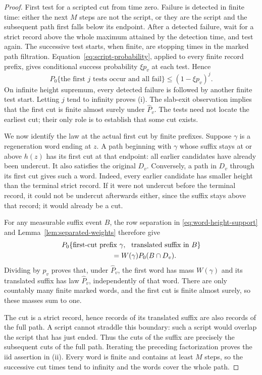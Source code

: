 \begin{proof}
First test for a scripted cut from time zero.  Failure is detected in
finite time: either the next \(M\) steps are not the script, or they
are the script and the subsequent path first falls below its endpoint.
After a detected failure, wait for a strict record above the whole
maximum attained by the detection time, and test again.  The successive
test starts, when finite, are stopping times in the marked path
filtration.  Equation~\eqref{eq:script-probability}, applied to every
finite record prefix, gives conditional success probability
\(\xi p_v\) at each test.  Hence
\[
 P_0\{\text{the first }j\text{ tests occur and all fail}\}
 \le (1-\xi p_v)^j.
\]
On infinite height supremum, every detected failure is followed by
another finite test start.  Letting \(j\) tend to infinity proves (i).
The slab-exit observation implies that the first cut is finite almost
surely under \(\widehat P_v\).  The tests need not locate the earliest
cut; their only role is to establish that some cut exists.

We now identify the law at the actual first cut by finite prefixes.
Suppose \(\gamma\) is a
regeneration word ending at \(z\).  A path beginning with \(\gamma\)
whose suffix stays at or above \(h(z)\) has its first cut at that
endpoint: all earlier candidates have already been undercut.  It also
satisfies the original \(D_v\).  Conversely, a path in \(D_v\)
through its first cut gives such a word.  Indeed, every earlier
candidate has smaller height than the terminal strict record.  If it
were not undercut before the terminal record, it could not be undercut
afterwards either, since the suffix stays above that record; it would
already be a cut.

For any measurable suffix event \(B\), the row separation in
\eqref{eq:word-height-support} and
Lemma~\ref{lem:separated-weights} therefore give
\[
 \begin{split}
 &P_0\{\text{first-cut prefix }\gamma,\
          \text{ translated suffix in }B\}\\
 &\hspace{25mm}=W(\gamma)P_0(B\cap D_v).
 \end{split}
\]
Dividing by \(p_v\) proves that, under \(\widehat P_v\), the
first word has mass \(W(\gamma)\) and its translated suffix has law
\(\widehat P_v\), independently of that word.  There are only
countably many finite marked words, and the first cut is finite almost
surely, so these masses sum to one.

The cut is a strict record, hence records of its translated suffix are
also records of the full path.  A script cannot straddle this boundary:
such a script would overlap the script that has just ended.  Thus the
cuts of the suffix are precisely the subsequent cuts of the full path.
Iterating the preceding factorization proves the iid assertion in
(ii).  Every word is finite and contains at least \(M\) steps, so the
successive cut times tend to infinity and the words cover the whole
path.


\end{proof}
